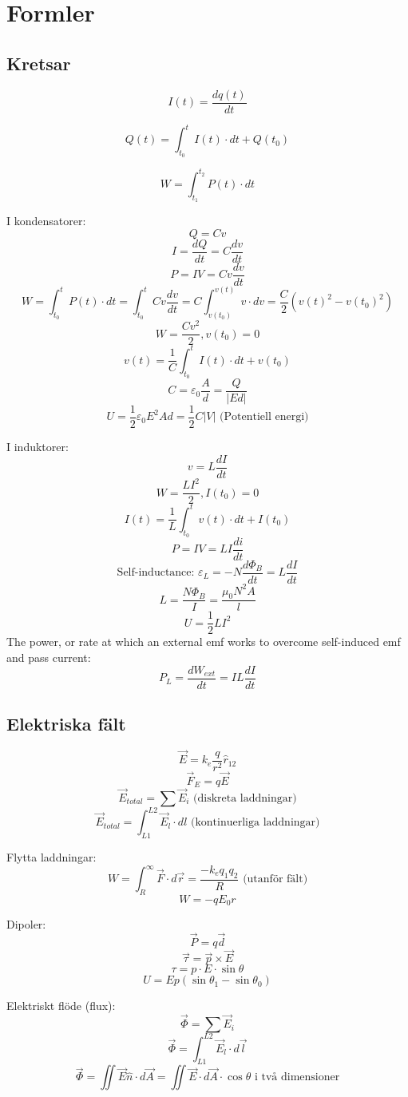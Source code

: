 \documentclass{article}
\begin{document}
\section{Formler}
\subsection{Kretsar}
\[ I(t) = \frac{dq(t)}{dt} \]

\[ Q(t) = \int_{t_0}^t I(t) \cdot dt + Q(t_0) \]

\[ W = \int_{t_1}^{t_2} P(t) \cdot dt \]

I kondensatorer:
\[ Q = Cv \]
\[ I = \frac{dQ}{dt} = C \frac{dv}{dt} \]
\[ P = IV = Cv \frac{dv}{dt} \]
\[ W = \int_{t_0}^t P(t) \cdot dt = \int_{t_0}^t Cv \frac{dv}{dt} = C \int_{v(t_0)}^{v(t)} v \cdot dv = \frac{C}{2}(v(t)^2 - v(t_0)^2) \]
\[ W = \frac{Cv^2}{2}, v(t_0) = 0 \]
\[ v(t) = \frac{1}{C} \int_{t_0}^t I(t)\cdot dt + v(t_0) \]
\[ C = \varepsilon_0 \frac{A}{d} = \frac{Q}{|Ed|} \]
\[ U = \frac{1}{2} \varepsilon_0 E^2Ad = \frac{1}{2} C |V| \textrm{ (Potentiell energi)} \]

I induktorer:
\[ v = L \frac{dI}{dt} \]
\[ W = \frac{LI^2}{2}, I(t_0) = 0 \]
\[ I(t) = \frac{1}{L} \int_{t_0}^t v(t) \cdot dt + I(t_0) \]
\[ P = IV = LI \frac{di}{dt} \]
\[ \textrm{Self-inductance: } \varepsilon_L = -N \frac{d\Phi_B}{dt} = L \frac{dI}{dt} \]
\[ L = \frac{N \Phi_B}{I} = \frac{\mu_0 N^2 A}{l} \]
\[ U = \frac{1}{2} LI^2 \]
The power, or rate at which an external emf works to overcome self-induced emf and pass current: \[ P_L = \frac{dW_{ext}}{dt} = IL\frac{dI}{dt} \]

\subsection{Elektriska fält}
\[ \vec{E} = k_e \frac{q}{r^2} \hat{r}_{12} \]
\[ \vec{F}_E  = q \vec{E} \]
\[ \vec{E}_{total} = \sum \vec{E}_i \textrm{ (diskreta laddningar)} \]
\[ \vec{E}_{total} = \int_{L1}^{L2} \vec{E}_l \cdot dl \textrm{ (kontinuerliga laddningar)} \]

Flytta laddningar:
\[ W =\int_R^{\infty} \vec{F} \cdot d\vec{r} = \frac{-k_eq_1q_2}{R} \textrm{ (utanför fält)} \]
\[ W = -qE_0r \]

Dipoler:
\[ \vec{P} = q \vec{d} \]
\[ \vec{\tau} = \vec{p} \times \vec{E} \]
\[ \tau = p \cdot E \cdot \sin{\theta} \]
\[ U = Ep(\sin \theta_1 - \sin \theta_0) \]

Elektriskt flöde (flux):
\[ \vec{\Phi} = \sum \vec{E}_i \]
\[ \vec{\Phi} = \int_{L1}^{L2} \vec{E}_l \cdot d\vec{l} \]
\[ \vec{\Phi} = \iint \vec{E}\hat{n} \cdot d\vec{A} = \iint \vec{E} \cdot d\vec{A} \cdot \cos{\theta} \textrm{ i två dimensioner}\]
\end{document}
